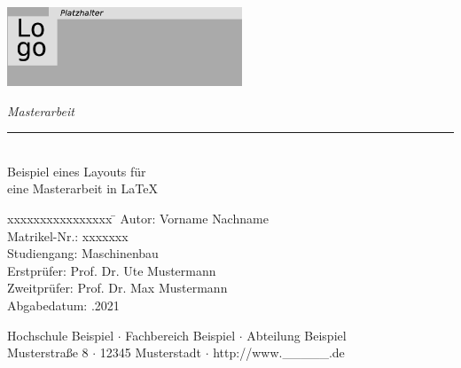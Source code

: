 \begin{titlepage}
	
\begin{flushleft} 
\includegraphics[width=7cm]{logo.png}
\end{flushleft} 
 
\begin{flushright}
\vspace{2cm}
\LARGE \textsl{Masterarbeit}\\
\rule{0.6\textwidth}{0.4pt} ~\\
\vspace{0.5cm}
\textsf{\LARGE Beispiel eines Layouts für}\\
\textsf{\LARGE eine Masterarbeit in \LaTeX}
\end{flushright}

\vspace{3cm}
\large
\begin{tabbing}
	xxxxxxxxxxxxxxxx \= \kill
	Autor: \> Vorname Nachname \\
	Matrikel-Nr.: \> xxxxxxx \\
	Studiengang: \> Maschinenbau \\ [0.5cm]
	Erstprüfer: \> Prof. Dr. Ute Mustermann \\
	Zweitprüfer: \> Prof. Dr. Max Mustermann \\ [0.5cm]
	Abgabedatum: .2021 \\
\end{tabbing}

\vspace{4cm}
\small
\begin{center}
	Hochschule Beispiel $\cdot$ 
	Fachbereich Beispiel $\cdot$ 
	Abteilung Beispiel \\
	Musterstraße 8 $\cdot$ 
	12345 Musterstadt $\cdot$ 
	http://www.\_\_\_\_\_.de
\end{center}

\end{titlepage}